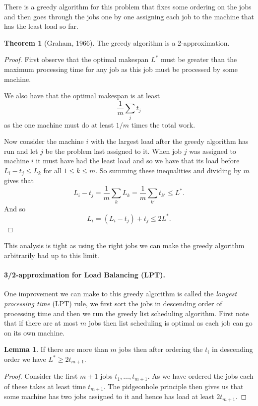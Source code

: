 \documentclass[11pt,a4paper]{article}
\theoremstyle{definition}
\newtheorem{thm}{Theorem}
\newtheorem{lem}{Lemma}
\begin{document}
There is a greedy algorithm for this problem that fixes some ordering on the jobs and then goes through the jobs one by one assigning each job to the machine that has the least load so far.

\begin{thm}[Graham, 1966]
The greedy algorithm is a 2-approximation.
\end{thm}
\begin{proof}
First observe that the optimal makespan $L^*$ must be greater than the maximum processing time for any job as this job must be processed by some machine.

We also have that the optimal makespan is at least
\[
\frac{1}{m}\sum_{j} t_j
\]
as the one machine must do at least $1/m$ times the total work.

Now consider the machine $i$ with the largest load after the greedy algorithm has run and let $j$ be the problem last assigned to it.
When job $j$ was assigned to machine $i$ it must have had the least load and so we have that its load before $L_i - t_j \le L_k$ for all $1 \le k \le m$.
So summing these inequalities and dividing by $m$ gives that
\[
L_i - t_j = \frac{1}{m}\sum_{k} L_k = \frac{1}{m}\sum_{k'} t_{k'} \le L^*.
\]
And so
\[
L_i = (L_i - t_j) + t_j \le 2L^*.
\]
\end{proof}

This analysis is tight as using the right jobs we can make the greedy algorithm arbitrarily bad up to this limit.

\paragraph{3/2-approximation for Load Balancing (LPT).}
One improvement we can make to this greedy algorithm is called the \emph{longest processing time} (LPT) rule, we first sort the jobs in descending order of processing time and then we run the greedy list scheduling algorithm.
First note that if there are at most $m$ jobs then list scheduling is optimal as each job can go on its own machine.
\begin{lem}
If there are more than $m$ jobs then after ordering the $t_i$ in descending order we have $L^* \ge 2 t_{m+1}$.
\end{lem}
\begin{proof}
Consider the first $m+1$ jobs $t_1,\ldots,t_{m+1}$.
As we have ordered the jobs each of these takes at least time $t_{m+1}$.
The pidgeonhole principle then gives us that some machine has two jobs assigned to it and hence has load at least $2t_{m+1}$.
\end{proof}
\end{document}
